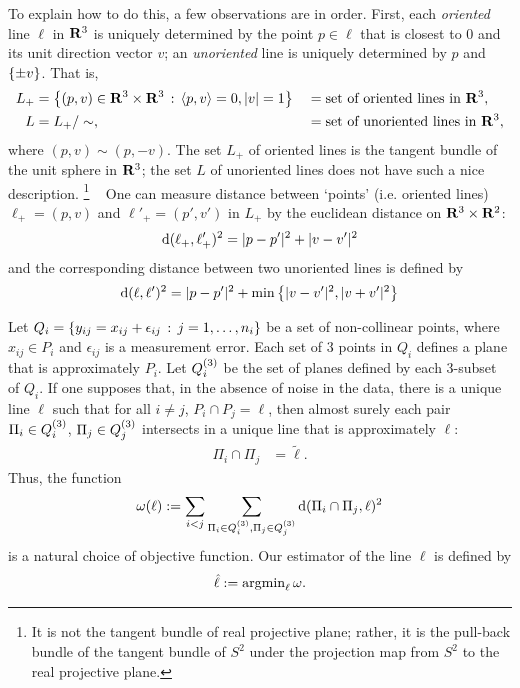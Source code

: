 \documentclass[a4paper,reqno]{amsart}
\begin{document}
To explain how to do this, a few observations are in order. First,
each {\em oriented} line $\ell$ in ${\mathbf R}^3$ is uniquely determined by
the point $p \in \ell$ that is closest to $0$ and its unit direction
vector $v$; an {\em unoriented} line is uniquely determined by $p$ and
$\left\{\pm v\right\}$. That is,
\begin{align*}
  L_+ &= \left\{ (p,v) \in {\mathbf R}^3 \times {\mathbf R}^3 \,:\, \langle p,v \rangle=0,|v|=1 \right\}
    && =\textrm{set of oriented lines in }{\mathbf R}^3,\\
    L &= L_+/\sim, && =\textrm{set of unoriented lines in }{\mathbf R}^3,
\end{align*}
where $(p,v) \sim (p,-v)$. The set $L_+$ of oriented lines is the
tangent bundle of the unit sphere in ${\mathbf R}^3$; the set $L$ of unoriented
lines does not have such a nice description.%
\footnote{It is not the tangent bundle of real projective plane;
  rather, it is the pull-back bundle of the tangent bundle of $S^2$
  under the projection map from $S^2$ to the real projective plane.}
\ %
One can measure distance between `points' (i.e. oriented lines) $\ell_+=(p,v)$
and $\ell'_+=(p',v')$ in $L_+$ by the euclidean distance on ${\mathbf R}^3
\times {\mathbf R}^2$:
\begin{equation}
  \label{eq:distance-between-lines}
  {\mathrm d}(\ell_+,\ell'_+)^2 = |p-p'|^2 + |v-v'|^2
\end{equation}
and the corresponding distance between two unoriented lines is defined
by
\begin{equation}
  \label{eq:distance-between-unoriented-lines}
  {\mathrm d}(\ell,\ell')^2 = |p-p'|^2 + \min\left\{ |v-v'|^2,|v+v'|^2\right\}
\end{equation}

Let $Q_i=\left\{y_{ij}=x_{ij}+\epsilon_{ij} \,:\, j=1,\ldots,n_i\right\}$ be a
set of non-collinear points, where $x_{ij} \in P_i$ and
$\epsilon_{ij}$ is a measurement error. Each set of $3$ points in
$Q_i$ defines a plane that is approximately $P_i$. Let
$Q_i^{(3)}$ be the set of planes defined by each $3$-subset of
$Q_i$. If one supposes that, in the absence of noise in the data,
there is a unique line $\ell$ such that for all $i\neq j$, $P_i \cap
P_j = \ell$, then almost surely each pair
$\Pi_i\in Q_i^{(3)}$, $\Pi_j\in Q_j^{(3)}$ intersects in
a unique line that is approximately $\ell$:
  \begin{align}
    \label{eq:plane-intersection}
    \Pi_i \cap \Pi_j &= \tilde{\ell}.
  \end{align}
Thus, the function
\begin{align}
  \label{eq:objective-function}
  \omega(\ell) := \sum_{i < j}
  \sum_{\Pi_i\in Q_i^{(3)},\Pi_j\in Q_j^{(3)}} {\mathrm d}(\Pi_i \cap \Pi_j,\ell)^2
\end{align}
is a natural choice of objective function. Our estimator of the line
$\ell$ is defined by
\begin{align}
  \label{eq:line-estimator}
  \hat{\ell} := {\displaystyle\mathrm{argmin}_{\ell}\,\omega}.
\end{align}
\end{document}
